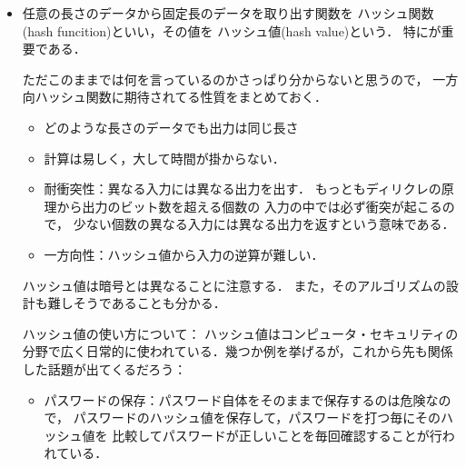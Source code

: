 \begin{itemize}
\begin{Q}
\begin{verbatim}
   % echo "abc" > test
   % tar -czf test.tar.gz test #適当なバイナリーを作成
   % base64 -i test.tar.gz
   H4sIAIj+uGkAA+3PMQ6AIAwFUGZP0SO0WOA8aGQ1Ebi/IMaRDY1J3/
   LTtMNv2mJSgyGiZYaazporUbf5xkCGjHGacbaApImcAhxdrMox+aNU2
   VPMvbtyFkJn3x6BJ3/CL+v0dQchhBDvOwEZLljpAAgAAA==
\end{verbatim}
\verb/#/ 画面に入らないので適当に改行
\end{Q}

  
 
   \item
     任意の長さのデータから固定長のデータを取り出す関数を
     ハッシュ関数(hash funcition)といい，その値を
     ハッシュ値(hash value)という．
    特にが重要である．
 
      ただこのままでは何を言っているのかさっぱり分からないと思うので，
      一方向ハッシュ関数に期待されてる性質をまとめておく．
     \begin{itemize}
         \item
            どのような長さのデータでも出力は同じ長さ
         \item
            計算は易しく，大して時間が掛からない．
         \item
            耐衝突性：異なる入力には異なる出力を出す．
            もっともディリクレの原理から出力のビット数を超える個数の
            入力の中では必ず衝突が起こるので，
            少ない個数の異なる入力には異なる出力を返すという意味である．
            
         \item
            一方向性：ハッシュ値から入力の逆算が難しい．
      \end{itemize}
      \emptyline

      ハッシュ値は暗号とは異なることに注意する．
      また，そのアルゴリズムの設計も難しそうであることも分かる．
      \emptyline
      
      
      ハッシュ値の使い方について：
      ハッシュ値はコンピュータ・セキュリティの分野で広く日常的に使われている．幾つか例を挙げるが，これから先も関係した話題が出てくるだろう：
       \begin{itemize}
         \item 
            パスワードの保存：パスワード自体をそのままで保存するのは危険なので，
            パスワードのハッシュ値を保存して，パスワードを打つ毎にそのハッシュ値を
            比較してパスワードが正しいことを毎回確認することが行われている．
            \emptyline


\end{itemize}
\end{itemize}

